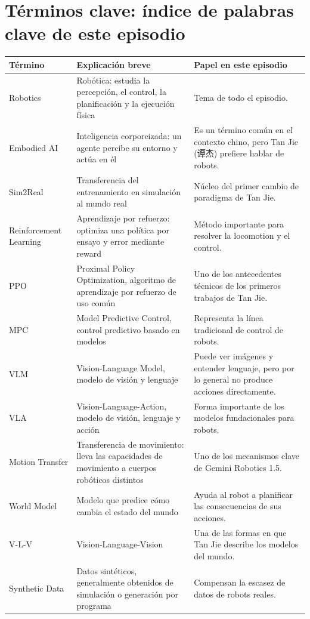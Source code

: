 \section{Términos clave: índice de palabras clave de este episodio}

\begin{longtable}{p{}p{}p{}}
\toprule
Término & Explicación breve & Papel en este episodio \\
\midrule
Robotics & Robótica: estudia la percepción, el control, la planificación y la ejecución física & Tema de todo el episodio. \\
Embodied AI & Inteligencia corporeizada: un agente percibe su entorno y actúa en él & Es un término común en el contexto chino, pero Tan Jie (谭杰) prefiere hablar de robots. \\
Sim2Real & Transferencia del entrenamiento en simulación al mundo real & Núcleo del primer cambio de paradigma de Tan Jie. \\
Reinforcement Learning & Aprendizaje por refuerzo: optimiza una política por ensayo y error mediante reward & Método importante para resolver la locomotion y el control. \\
PPO & Proximal Policy Optimization, algoritmo de aprendizaje por refuerzo de uso común & Uno de los antecedentes técnicos de los primeros trabajos de Tan Jie. \\
MPC & Model Predictive Control, control predictivo basado en modelos & Representa la línea tradicional de control de robots. \\
VLM & Vision-Language Model, modelo de visión y lenguaje & Puede ver imágenes y entender lenguaje, pero por lo general no produce acciones directamente. \\
VLA & Vision-Language-Action, modelo de visión, lenguaje y acción & Forma importante de los modelos fundacionales para robots. \\
Motion Transfer & Transferencia de movimiento: lleva las capacidades de movimiento a cuerpos robóticos distintos & Uno de los mecanismos clave de Gemini Robotics 1.5. \\
World Model & Modelo que predice cómo cambia el estado del mundo & Ayuda al robot a planificar las consecuencias de sus acciones. \\
V-L-V & Vision-Language-Vision & Una de las formas en que Tan Jie describe los modelos del mundo. \\
Synthetic Data & Datos sintéticos, generalmente obtenidos de simulación o generación por programa & Compensan la escasez de datos de robots reales. \\

\end{longtable}

